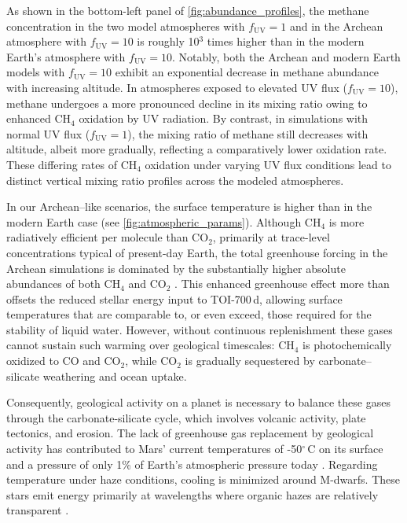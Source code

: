 As shown in the bottom-left panel of \autoref{fig:abundance_profiles}, the methane concentration in the two model atmospheres with $f_\mathrm{UV}=1$ and in the Archean atmosphere with $f_\mathrm{UV}=10$ is roughly 10$^3$ times higher than in the modern Earth's atmosphere with $f_\mathrm{UV}=10$. Notably, both the Archean and modern Earth models with $f_\mathrm{UV}=10$ exhibit an exponential decrease in methane abundance with increasing altitude. In atmospheres exposed to elevated UV flux ($f_\mathrm{UV}=10$), methane undergoes a more pronounced decline in its mixing ratio owing to enhanced CH$_4$ oxidation by UV radiation. By contrast, in simulations with normal UV flux ($f_\mathrm{UV}=1$), the mixing ratio of methane still decreases with altitude, albeit more gradually, reflecting a comparatively lower oxidation rate. These differing rates of CH$_4$ oxidation under varying UV flux conditions lead to distinct vertical mixing ratio profiles across the modeled atmospheres.

In our Archean--like scenarios, the surface temperature is higher than in the modern Earth case (see \autoref{fig:atmospheric_params}). Although CH$_4$ is more radiatively efficient per molecule than CO$_2$, primarily at trace-level concentrations typical of present-day Earth, the total greenhouse forcing in the Archean simulations is dominated by the substantially higher absolute abundances of both CH$_4$ and CO$_2$ \citep[see][]{Kiehl.and.Dickinson.1987JGR....92.2991K, Etminan.et.al.2016GeoRL..4312614E}. This enhanced greenhouse effect more than offsets the reduced stellar energy input to TOI-700\,d, allowing surface temperatures that are comparable to, or even exceed, those required for the stability of liquid water.
However, without continuous replenishment these gases cannot sustain such warming over geological timescales: CH$_4$ is photochemically oxidized to CO and CO$_2$, while CO$_2$ is gradually sequestered by carbonate--silicate weathering and ocean uptake.

Consequently, geological activity on a planet is necessary to balance these gases through the carbonate-silicate cycle, which involves volcanic activity, plate tectonics, and erosion. The lack of greenhouse gas replacement by geological activity has contributed to Mars' current temperatures of -50$^\circ$\,C on its surface and a pressure of only 1\% of Earth's atmospheric pressure today \citep{Segura-Navarro2005}. 
Regarding temperature under haze conditions, cooling is minimized around M-dwarfs. These stars emit energy primarily at wavelengths where organic hazes are relatively transparent \citep{Arney.et.al.2017ApJ...836...49A}.


